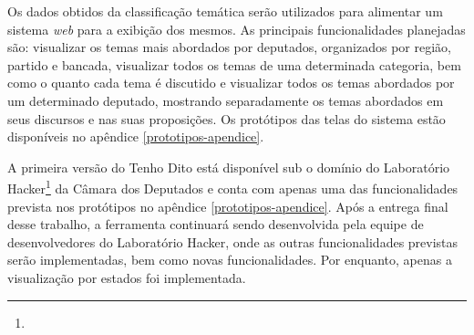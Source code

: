 Os dados obtidos da classificação temática serão utilizados para alimentar um sistema \textit{web} para a exibição dos
mesmos. As principais funcionalidades planejadas são: visualizar os temas mais abordados por deputados, organizados por região, partido e bancada, visualizar todos os temas de uma determinada categoria, bem como o quanto cada tema é discutido e visualizar todos os temas abordados por um determinado deputado, mostrando separadamente os temas abordados em seus discursos e nas suas proposições. Os protótipos das telas do sistema estão disponíveis no apêndice \ref{prototipos-apendice}.

A primeira versão do Tenho Dito está disponível sub o domínio do Laboratório Hacker\footnote{} da Câmara dos Deputados e conta com apenas uma das funcionalidades prevista nos protótipos no apêndice \ref{prototipos-apendice}. Após a entrega final desse trabalho, a ferramenta continuará sendo desenvolvida pela equipe de desenvolvedores do Laboratório Hacker, onde as outras funcionalidades previstas serão implementadas, bem como novas funcionalidades. Por enquanto, apenas a visualização por estados foi implementada.
